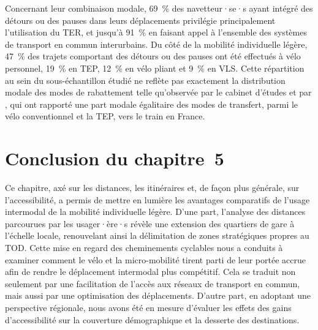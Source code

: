 \begin{refsegment}
Concernant leur combinaison modale, 69~\% des navetteur·se·s ayant intégré des détours ou des pauses dans leurs déplacements privilégie principalement l'utilisation du \acrshort{TER}, et jusqu'à 91~\% en faisant appel à l'ensemble des systèmes de transport en commun interurbains. Du côté de la mobilité individuelle légère, 47~\% des trajets comportant des détours ou des pauses ont été effectués à vélo personnel, 19~\% en \acrshort{TEP}, 12~\% en vélo pliant et 9~\% en \acrshort{VLS}. Cette répartition au sein du sous-échantillon étudié ne reflète pas exactement la distribution modale des modes de rabattement telle qu'observée par le cabinet d'études \textcolor{blue}{\textcite{enov_enquete_2021}} et par \textcolor{blue}{\textcite[180]{moinse_intermodal_2022}}, qui ont rapporté une part modale égalitaire des modes de transfert, parmi le vélo conventionnel et la \acrshort{TEP}, vers le train en France.%

    \newpage
\section*{Conclusion du chapitre~5
    \label{chap5:conclusion}
    }

Ce chapitre, axé sur les distances, les itinéraires et, de façon plus générale, sur l'accessibilité, a permis de mettre en lumière les avantages comparatifs de l'usage intermodal de la mobilité individuelle légère. D'une part, l'analyse des distances parcourues par les usager·ère·s révèle une extension des quartiers de gare à l'échelle locale, renouvelant ainsi la délimitation de zones stratégiques propres au \acrshort{TOD}. Cette mise en regard des cheminements cyclables nous a conduits à examiner comment le vélo et la micro-mobilité tirent parti de leur portée accrue afin de rendre le déplacement intermodal plus compétitif. Cela se traduit non seulement par une facilitation de l'accès aux réseaux de transport en commun, mais aussi par une optimisation des déplacements. D'autre part, en adoptant une perspective régionale, nous avons été en mesure d'évaluer les effets des gains d'accessibilité sur la couverture démographique et la desserte des destinations.%


\end{refsegment}
